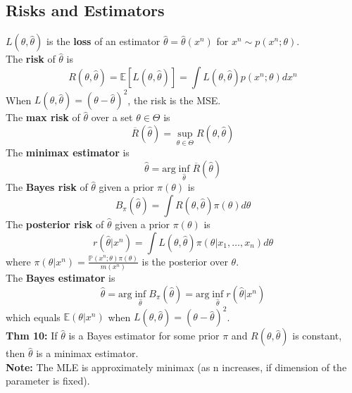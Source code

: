 \documentclass[10pt,twocolumn]{article}
\begin{document}
\subsection*{Risks and Estimators}
$L(\theta,\hat{\theta})$ is the \textbf{loss} of an estimator $\hat{\theta} = \hat{\theta}(x^{n})$ for $x^{n} \sim p(x^{n};\theta)$.\\
The \textbf{risk} of $\hat{\theta}$ is
\begin{equation}
    R(\theta,\hat{\theta}) = \mathbb{E}[L(\theta,\hat{\theta})] = \int L(\theta,\hat{\theta}) p(x^{n};\theta) dx^{n}
\end{equation}
When $L(\theta,\hat{\theta}) = (\theta-\hat{\theta})^{2}$, the risk is the MSE.\\
The \textbf{max risk} of $\hat{\theta}$ over a set $\theta \in \Theta$ is
\begin{equation}
    \overline{R}(\hat{\theta}) = \sup_{\theta \in \Theta} R(\theta,\hat{\theta})
\end{equation}
The \textbf{minimax estimator} is
\begin{equation}
    \hat{\theta} = \text{arg}\inf_{\hat{\theta}} \overline{R}(\hat{\theta})
\end{equation}
The \textbf{Bayes risk} of $\hat{\theta}$ given a prior $\pi(\theta)$ is
\begin{equation}
    B_{\pi}(\hat{\theta}) = \int R(\theta,\hat{\theta}) \pi(\theta) d\theta
\end{equation}
The \textbf{posterior risk} of $\hat{\theta}$ given a prior $\pi(\theta)$ is
\begin{equation}
    r(\hat{\theta}|x^{n}) = \int L(\theta,\hat{\theta}) \pi(\theta|x_{1},\ldots,x_{n}) d\theta    
\end{equation}
where $\pi(\theta|x^{n}) = \frac{\mathbb{P}(x^{n};\theta)\pi(\theta)}{m(x^{n})}$ is the posterior over $\theta$.\\
The \textbf{Bayes estimator} is
\begin{equation}
    \hat{\theta} = \text{arg}\inf_{\hat{\theta}} B_{\pi}(\hat{\theta}) = \text{arg}\inf_{\hat{\theta}} r(\hat{\theta}|x^{n})
\end{equation}
which equals $\mathbb{E}(\theta|x^{n})$ when $L(\theta,\hat{\theta}) = (\theta-\hat{\theta})^{2}$.\\
\textbf{Thm 10:} If $\hat{\theta}$ is a Bayes estimator for some prior $\pi$ and $R(\theta,\hat{\theta})$ is constant, then $\hat{\theta}$ is a minimax estimator.\\
\textbf{Note:} The MLE is approximately minimax (as n increases, if dimension of the parameter is fixed).
\end{document}
